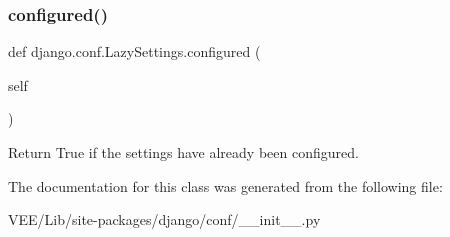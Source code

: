 \subsubsection{\texorpdfstring{configured()}{configured()}}
{\footnotesize\ttfamily def django.\+conf.\+Lazy\+Settings.\+configured (\begin{DoxyParamCaption}\item[{}]{self }\end{DoxyParamCaption})}

\begin{DoxyVerb}Return True if the settings have already been configured.\end{DoxyVerb}
 

The documentation for this class was generated from the following file\+:\begin{DoxyCompactItemize}
\item 
V\+E\+E/\+Lib/site-\/packages/django/conf/\+\_\+\+\_\+init\+\_\+\+\_\+.\+py\end{DoxyCompactItemize}
